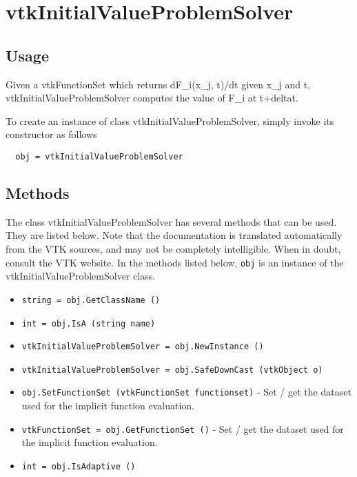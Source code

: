 \section{vtkInitialValueProblemSolver}

\subsection{Usage}

 Given a vtkFunctionSet which returns dF\_i(x\_j, t)/dt given x\_j and
 t, vtkInitialValueProblemSolver computes the value of F\_i at t+deltat.

To create an instance of class vtkInitialValueProblemSolver, simply
invoke its constructor as follows
\begin{verbatim}
  obj = vtkInitialValueProblemSolver
\end{verbatim}
\subsection{Methods}

The class vtkInitialValueProblemSolver has several methods that can be used.
  They are listed below.
Note that the documentation is translated automatically from the VTK sources,
and may not be completely intelligible.  When in doubt, consult the VTK website.
In the methods listed below, \verb|obj| is an instance of the vtkInitialValueProblemSolver class.
\begin{itemize}
\item  \verb|string = obj.GetClassName ()|

\item  \verb|int = obj.IsA (string name)|

\item  \verb|vtkInitialValueProblemSolver = obj.NewInstance ()|

\item  \verb|vtkInitialValueProblemSolver = obj.SafeDownCast (vtkObject o)|

\item  \verb|obj.SetFunctionSet (vtkFunctionSet functionset)| -  Set / get the dataset used for the implicit function evaluation.

\item  \verb|vtkFunctionSet = obj.GetFunctionSet ()| -  Set / get the dataset used for the implicit function evaluation.

\item  \verb|int = obj.IsAdaptive ()|

\end{itemize}
